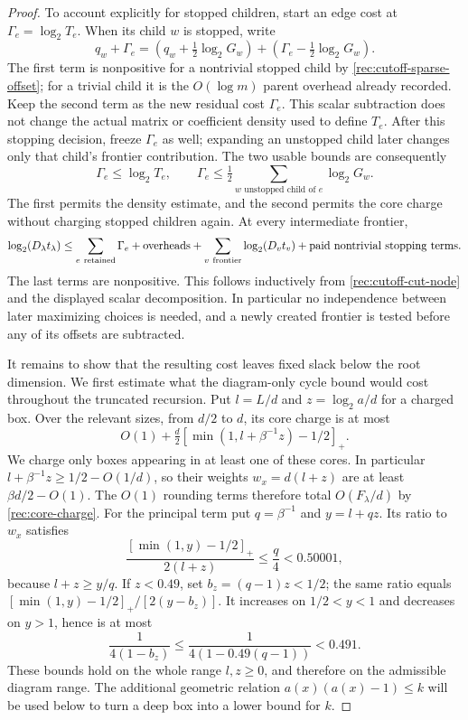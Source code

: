 \begin{proof}
To account explicitly for stopped children, start an edge cost at
$\Gamma_e=\log_2T_e$.  When its child $w$ is stopped, write
\[
 q_w+\Gamma_e=
 \left(q_w+\tfrac12\log_2G_w\right)
 +\left(\Gamma_e-\tfrac12\log_2G_w\right).
\]
The first term is nonpositive for a nontrivial stopped child by
\eqref{rec:cutoff-sparse-offset}; for a trivial child it is the
$O(\log m)$ parent overhead already recorded.  Keep the second term
as the new residual cost $\Gamma_e$.  This scalar subtraction does not
change the actual matrix or coefficient density used to define $T_e$.
After this stopping decision, freeze $\Gamma_e$ as well; expanding an
unstopped child later changes only that child's frontier contribution.
The two usable bounds are consequently
\[
 \Gamma_e\le\log_2T_e,\qquad
 \Gamma_e\le\tfrac12\sum_{w\text{ unstopped child of }e}\log_2G_w.
\]
The first permits the density estimate, and the second permits the core
charge without charging stopped children again.
At every intermediate frontier,
\begin{equation}\label{rec:cutoff-actual-invariant}
 \log_2(D_\lambda t_\lambda)
 \le \sum_{e\ \rm retained}\Gamma_e+
       \mathrm{overheads}+\sum_{v\ \rm frontier}\log_2(D_vt_v)
       +\mathrm{paid\ nontrivial\ stopping\ terms}.
\end{equation}
The last terms are nonpositive.  This follows inductively from
\eqref{rec:cutoff-cut-node} and the displayed scalar decomposition.
In particular no independence between later maximizing choices is needed,
and a newly created frontier is tested before any of its offsets are
subtracted.

It remains to show that the resulting cost leaves fixed slack below the
root dimension.  We first estimate what the diagram-only cycle bound would
cost throughout the truncated recursion.  Put $l=L/d$ and
$z=\log_2a/d$ for a charged box.
Over the relevant sizes, from $d/2$ to $d$, its core charge is at most
\begin{equation}\label{rec:cutoff-box-cost}
 O(1)+\tfrac d2[\min(1,l+\beta^{-1}z)-1/2]_+.
\end{equation}
We charge only boxes appearing in at least one of these cores.  In
particular $l+\beta^{-1}z\ge1/2-O(1/d)$, so their weights
$w_x=d(l+z)$ are at least $\beta d/2-O(1)$.  The $O(1)$ rounding
terms therefore total $O(F_\lambda/d)$ by \eqref{rec:core-charge}.
For the principal term put $q=\beta^{-1}$ and $y=l+qz$.  Its ratio
to $w_x$ satisfies
\[
 \frac{[\min(1,y)-1/2]_+}{2(l+z)}
 \le\frac q4<0.50001,
\]
because $l+z\ge y/q$.  If $z<0.49$, set $b_z=(q-1)z<1/2$;
the same ratio equals
$[\min(1,y)-1/2]_+/[2(y-b_z)]$.  It increases on $1/2<y<1$
and decreases on $y>1$, hence is at most
\[
 \frac1{4(1-b_z)}\le
 \frac1{4(1-0.49(q-1))}<0.491.
\]
These bounds hold on the whole range $l,z\ge0$, and therefore on the
admissible diagram range.  The additional geometric relation
$a(x)(a(x)-1)\le k$ will be used below to turn a deep box into a
lower bound for $k$.


\end{proof}
